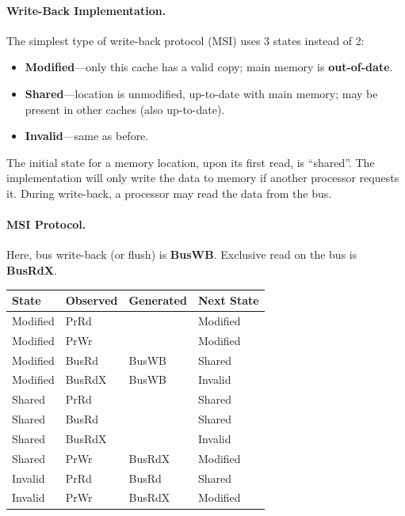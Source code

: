 \documentclass[a4paper]{report}
\begin{document}
\paragraph{Write-Back Implementation.}
     The simplest type of write-back protocol (MSI) uses 3 states instead of 2:
      \begin{itemize}
        \item {\bf Modified}---only this cache has a valid copy; 
          main memory is {\bf out-of-date}.
        \item {\bf Shared}---location is unmodified, 
           up-to-date with main
          memory; 
          \quad may be present in other caches (also up-to-date).
        \item {\bf Invalid}---same as before.
      \end{itemize}
      
The initial state for a memory location, upon its first read, is ``shared''.
The implementation will only write the data to memory if another
processor requests it.
During write-back, a processor may read the data from the bus.

\paragraph{MSI Protocol.} Here, bus write-back (or flush) is {\bf BusWB}.
Exclusive read on the bus is {\bf BusRdX}.

\begin{center}
    \begin{tabular}{l|l|l|l}
      {\bf State} & {\bf Observed} & {\bf Generated} & {\bf Next State}\\ \hline
      Modified   & PrRd   &        & Modified\\
      Modified   & PrWr   &        & Modified\\
      Modified   & BusRd  & BusWB  & Shared\\
      Modified   & BusRdX & BusWB  & Invalid\\
      Shared     & PrRd   &        & Shared\\
      Shared     & BusRd  &        & Shared\\
      Shared     & BusRdX &        & Invalid\\
      Shared     & PrWr   & BusRdX & Modified\\
      Invalid    & PrRd   & BusRd  & Shared\\
      Invalid    & PrWr   & BusRdX & Modified\\
    \end{tabular}
\end{center}
\end{document}
